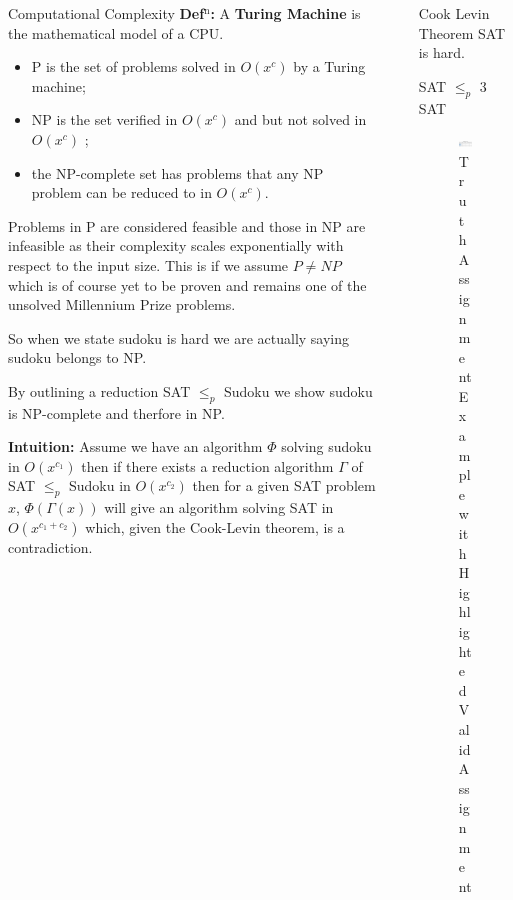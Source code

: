 \documentclass[final]{beamer}
\newlength{\sepwidth}
\newlength{\colwidth}
\newcounter{col}
\newcommand{\separatorcolumn}{\begin{column}{\sepwidth}\end{column}}
\begin{document}
\begin{frame}[t]
\begin{columns}[t]
\begin{column}{\colwidth}
\begin{block}{Computational Complexity \cite{arora2006computational}}
\textbf{Def$^\text{n}$:} A \textbf{Turing Machine} is the mathematical model of a CPU.



 \begin{itemize}
	\item{P is the set of problems solved in $O(x^c)$ by a Turing machine;} 
	\item{NP is the set verified in $O(x^c)$ and but not solved in $O(x^c)$ ;} 
	\item{the NP-complete set has problems that any NP problem can be reduced to in $O(x^c)$.} 
\end{itemize}
Problems in P are considered feasible and those in NP are infeasible as their complexity scales exponentially with respect to the input size. This is if we assume $P\neq NP$ which is of course yet to be proven and remains one of the unsolved Millennium Prize problems. 

So when we state sudoku is hard we are actually saying sudoku belongs to NP.

By outlining a reduction SAT $ \leq_p $ Sudoku we show sudoku is NP-complete and therfore in NP. 

\textbf{Intuition:} Assume we have an algorithm $\Phi$ solving sudoku in $O(x^{c_1})$ then if there exists a reduction algorithm $\Gamma$ of SAT $ \leq_p $ Sudoku in $O(x^{c_2})$  then for a given SAT problem $x$, $\Phi(\Gamma(x))$ will give an algorithm solving SAT in $O(x^{c_1+c_2})$ which, given the Cook-Levin theorem, is a contradiction. 

  \end{block}

\end{column}

\separatorcolumn

\begin{column}{\colwidth}  
\begin{alertblock}{Cook Levin Theorem}
SAT is hard.
  \end{alertblock}
  \begin{block}{SAT $\leq_p$ 3 SAT}

\begin{figure}
		\includegraphics[width=70mm]{sat_example.png}
		\caption{Truth Assignment Example with Highlighted Valid Assignment}
		\vspace{-10pt}
\end{figure}


\end{block}
\end{column}
\end{columns}
\end{frame}
\end{document}
